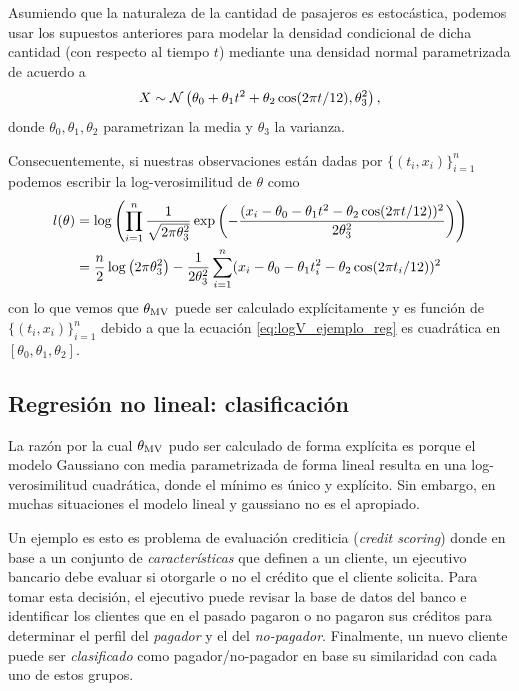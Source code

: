 Asumiendo que la naturaleza de la cantidad de pasajeros es estocástica, podemos usar los supuestos anteriores para modelar la densidad condicional  de dicha cantidad (con respecto al tiempo $t$) mediante una densidad normal parametrizada de acuerdo a 
\begin{equation}
	X \sim {\mathcal N}\left(\theta_0 + \theta_1 t^2 + \theta_2\cos(2\pi t/12), \theta_3^2\right),
\end{equation}
donde $\theta_0,\theta_1,\theta_2$ parametrizan la media y $\theta_3$ la varianza. 

Consecuentemente, si nuestras observaciones están dadas por $\{(t_i,x_i)\}_{i=1}^n$ podemos escribir la log-verosimilitud de $\theta$ como 
\begin{align}
	\label{eq:logV_ejemplo_reg}
	l(\theta) 	&=\log\left(\prod_{i=1}^n \frac{1}{\sqrt{2\pi\theta_3^2}}\exp\left(-\frac{(x_i-\theta_0 - \theta_1 t^2 - \theta_2\cos(2\pi t/12))^2}{2\theta_3^2}\right)\right)\nonumber \\
	&=\frac{n}{2}\log\left(2\pi\theta_3^2\right)  - \frac{1}{2\theta_3^2}\sum_{i=1}^n (x_i - \theta_0 - \theta_1 t_i^2 - \theta_2\cos(2\pi t_i/12))^2
\end{align}
con lo que vemos que ${\theta_\text{MV}}$ puede ser calculado explícitamente y es función de $\{(t_i,x_i)\}_{i=1}^n$ debido a que la ecuación \eqref{eq:logV_ejemplo_reg} es cuadrática en $[\theta_0,\theta_1,	\theta_2]$.



\subsection{Regresión no lineal: clasificación} 
\label{sub:clasif}

La razón por la cual ${\theta_\text{MV}}$ pudo ser calculado de forma explícita es porque el modelo Gaussiano con media parametrizada de forma lineal resulta en una log-verosimilitud cuadrática, donde el mínimo es único y explícito. Sin embargo, en muchas situaciones el modelo lineal y gaussiano no es el apropiado. 

Un ejemplo es esto es problema de evaluación crediticia (\textit{credit scoring}) donde en base a un conjunto de \textit{características} que definen a un cliente, un ejecutivo bancario debe evaluar si otorgarle o no el crédito que el cliente solicita. Para tomar esta decisión, el ejecutivo puede revisar la base de datos del banco e identificar los clientes que en el pasado pagaron o no pagaron sus créditos para determinar el perfil del \textit{pagador} y el del \textit{no-pagador}. Finalmente, un nuevo cliente puede ser \textit{clasificado} como pagador/no-pagador en base su similaridad con cada uno de estos grupos. 

